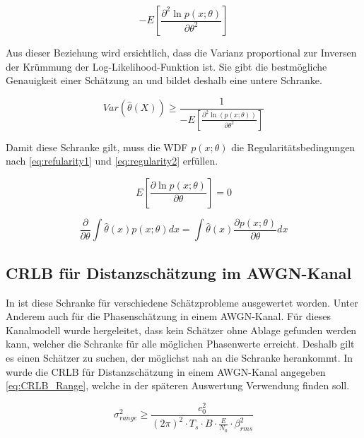 \begin{equation}
	 \label{eq:Curvature}	
	 -E \left[\frac{\partial^2 \ln p(x;\theta)}{\partial \theta^2} \right]
\end{equation}

Aus dieser Beziehung wird ersichtlich, dass die Varianz proportional zur Inversen der Krümmung der Log-Likelihood-Funktion ist. Sie gibt die bestmögliche Genauigkeit einer Schätzung an und bildet deshalb eine untere Schranke.

\begin{equation}
	\label{CRLB}
	Var(\hat{\theta}(X)) \geq \frac{1}{- E \left[ \frac{\partial^2 \ln(p(x;\theta))}{\partial\theta^2} \right]}
\end{equation} 

Damit diese Schranke gilt, muss die WDF $p(x;\theta)$ die Regularitätsbedingungen nach \eqref{eq:refularity1} und \eqref{eq:regularity2} erfüllen.

\begin{equation}
	\label{eq:refularity1}
	E \left[\frac{\partial\ln p(x;\theta)}{\partial \theta}\right] = 0	
\end{equation}

\begin{equation}
	\label{eq:regularity2}
	\frac{\partial}{\partial \theta} \int \hat{\theta}(x) p(x;\theta)dx = \int \hat{\theta}(x)\frac{\partial p(x;\theta)}{\partial \theta} dx
\end{equation}

\subsection{CRLB für Distanzschätzung im AWGN-Kanal}
\label{chap2.3.2:CRLB für Distanzschätzung im AWGN}

In \cite[S.33]{kay1993fundamentals} ist diese Schranke für verschiedene Schätzprobleme ausgewertet worden. Unter Anderem auch für die Phasenschätzung in einem \gls{AWGN}-Kanal. Für dieses Kanalmodell wurde hergeleitet, dass kein Schätzer ohne Ablage gefunden werden kann, welcher die Schranke für alle möglichen Phasenwerte erreicht. Deshalb gilt es einen Schätzer zu suchen, der möglichst nah an die Schranke herankommt. In \citep{nowak2014system} wurde die \gls{CRLB} für Distanzschätzung in einem \gls{AWGN}-Kanal angegeben \eqref{eq:CRLB_Range}, welche in der späteren Auswertung Verwendung finden soll.

\begin{equation}
	\label{eq:CRLB_Range}
	\sigma^2_{range} \geq \frac{c_0^2}{(2\pi)^2 \cdot T_s \cdot B \cdot \frac{E}{N_0} \cdot \beta_{rms}^2}
\end{equation}

